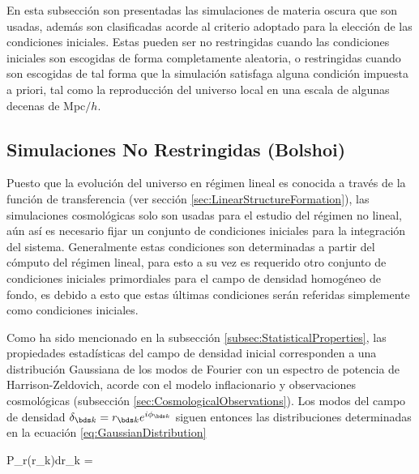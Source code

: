En esta subsección son presentadas las simulaciones de materia oscura que 
son usadas, además son clasificadas acorde al criterio adoptado para la 
elección de las condiciones iniciales. Estas pueden ser no restringidas
cuando las condiciones iniciales son escogidas de forma completamente 
aleatoria, o restringidas cuando son escogidas de tal forma que la 
simulación satisfaga alguna condición impuesta a priori, tal como la 
reproducción del universo local en una escala de algunas decenas de 
Mpc$/h$.


	\subsection{Simulaciones No Restringidas (Bolshoi)}
	\label{subsec:UnconstrainedSimulations}


Puesto que la evolución del universo en régimen lineal es conocida a 
través de la función de transferencia (ver sección 
\ref{sec:LinearStructureFormation}), las simulaciones cosmológicas solo 
son usadas para el estudio del régimen no lineal, aún así es necesario
fijar un conjunto de condiciones iniciales para la integración del sistema.
Generalmente estas condiciones son determinadas a partir del cómputo del 
régimen lineal, para esto a su vez es requerido otro conjunto de condiciones 
iniciales primordiales para el campo de densidad homogéneo de fondo, 
es debido a esto que estas últimas condiciones serán referidas simplemente 
como condiciones iniciales.


Como ha sido mencionado en la subsección \ref{subsec:StatisticalProperties},
las propiedades estadísticas del campo de densidad inicial corresponden a 
una distribución Gaussiana de los modos de Fourier con un espectro de
potencia de Harrison-Zeldovich, acorde con el modelo inflacionario y 
observaciones cosmológicas (subsección \ref{sec:CosmologicalObservations}).
Los modos del campo de densidad $\delta_{\bds k} = 
r_{\bds k}e^{i\phi_{\bds k}}$ siguen entonces las distribuciones 
determinadas en la ecuación \ref{eq:GaussianDistribution}


{ P_r(r_{\bds k})dr_{\bds k} = \exp{}
 }


